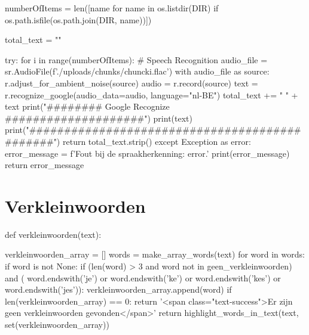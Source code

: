 \begin{python}
    numberOfItems = len([name for name in os.listdir(DIR) if os.path.isfile(os.path.join(DIR, name))])

    total_text = ""

    try:
        for i in range(numberOfItems):
        # Speech Recognition
        audio_file = sr.AudioFile(f'./uploads/chunks/chunck{i}.flac')
        with audio_file as source:
            r.adjust_for_ambient_noise(source)
            audio = r.record(source)
            text = r.recognize_google(audio_data=audio, language="nl-BE")
            total_text += " " + text
            print("######## Google Recognize ####################")
            print(text)
            print("##############################################")
            return total_text.strip()
    except Exception as error:
        error_message = f'Fout bij de spraakherkenning: {error}.'
        print(error_message)
        return error_message

\end{python}

\section{Verkleinwoorden}
\label{bijlage:verkleinwoorden}
\begin{python}
def verkleinwoorden(text):

    verkleinwoorden_array = []
    words = make_array_words(text)
    for word in words:
        if word is not None:
            if (len(word) > 3 and word not in geen_verkleinwoorden) and (
                word.endswith('je') or word.endswith('ke') or word.endswith('kes') or word.endswith('jes')):
                verkleinwoorden_array.append(word)
    if len(verkleinwoorden_array) == 0:
        return '<span class="text-success">Er zijn geen verkleinwoorden gevonden</span>'
    return highlight_words_in_text(text, set(verkleinwoorden_array))
\end{python}

